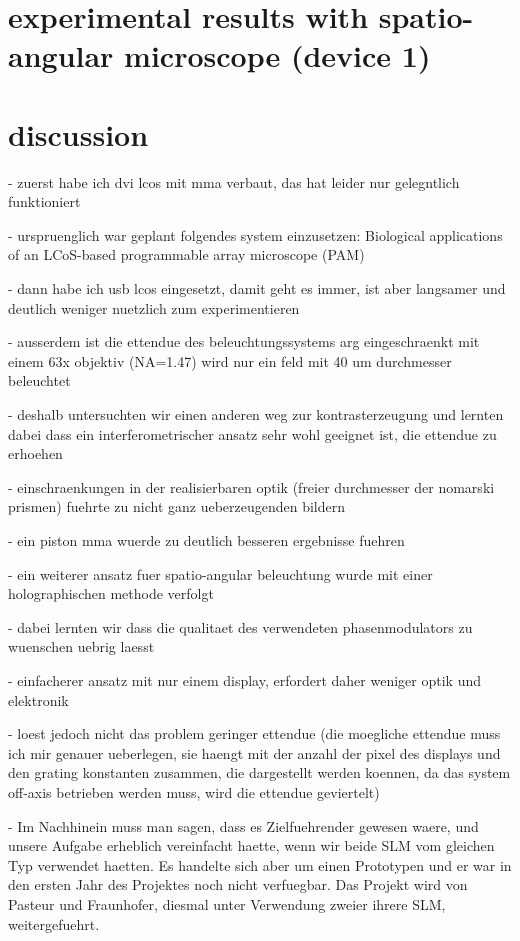 \documentclass[oneside,a4paper,12pt,BCOR20mm,DIV14]{scrbook}
\begin{document}
\chapter{experimental results with spatio-angular microscope (device 1)}
\label{sec:results}
\chapter{discussion}
\label{sec:discussion}
- zuerst habe ich dvi lcos mit mma verbaut, das hat leider nur
  gelegntlich funktioniert

- urspruenglich war geplant folgendes system einzusetzen: Biological
  applications of an LCoS-based programmable array microscope (PAM)

- dann habe ich usb lcos eingesetzt, damit geht es immer, ist aber
  langsamer und deutlich weniger nuetzlich zum experimentieren

- ausserdem ist die ettendue des beleuchtungssystems arg
  eingeschraenkt mit einem 63x objektiv (NA=1.47) wird nur ein feld
  mit 40 um durchmesser beleuchtet

- deshalb untersuchten wir einen anderen weg zur kontrasterzeugung und
  lernten dabei dass ein interferometrischer ansatz sehr wohl geeignet
  ist, die ettendue zu erhoehen

  - einschraenkungen in der realisierbaren optik (freier durchmesser
    der nomarski prismen) fuehrte zu nicht ganz ueberzeugenden bildern

  - ein piston mma wuerde zu deutlich besseren ergebnisse fuehren

- ein weiterer ansatz fuer spatio-angular beleuchtung wurde mit einer
  holographischen methode verfolgt

  - dabei lernten wir dass die qualitaet des verwendeten
    phasenmodulators zu wuenschen uebrig laesst

  - einfacherer ansatz mit nur einem display, erfordert daher weniger
    optik und elektronik

  - loest jedoch nicht das problem geringer ettendue (die moegliche
    ettendue muss ich mir genauer ueberlegen, sie haengt mit der
    anzahl der pixel des displays und den grating konstanten zusammen,
    die dargestellt werden koennen, da das system off-axis betrieben
    werden muss, wird die ettendue geviertelt)

- Im Nachhinein muss man sagen, dass es Zielfuehrender gewesen
    waere, und unsere Aufgabe erheblich vereinfacht haette, wenn wir
    beide SLM vom gleichen Typ verwendet haetten. Es handelte sich
    aber um einen Prototypen und er war in den ersten Jahr des
    Projektes noch nicht verfuegbar. Das Projekt wird von Pasteur und
    Fraunhofer, diesmal unter Verwendung zweier ihrere SLM,
    weitergefuehrt. 
\end{document}
